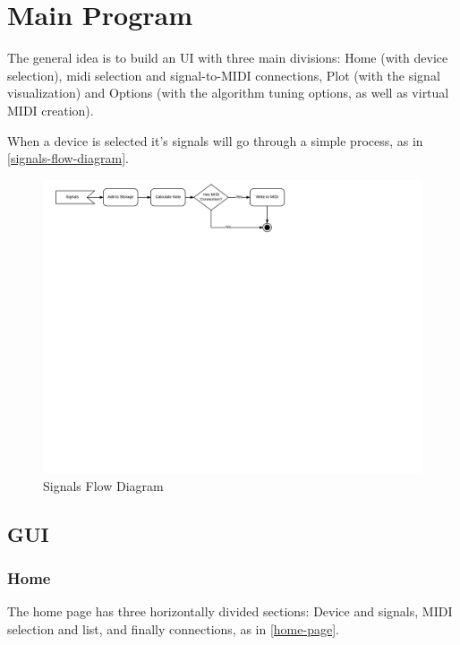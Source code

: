 \section{Main Program}
\label{main-program}

The general idea is to build an UI with three main divisions: Home (with device
selection), midi selection and signal-to-MIDI connections, Plot (with the signal
visualization) and Options (with the algorithm tuning options, as well as virtual
MIDI creation).

When a device is selected it's signals will go through a simple process, as in \autoref{signals-flow-diagram}.
\begin{figure}[htb]
	\caption{Signals Flow Diagram}
  \label{signals-flow-diagram}
	\begin{center}
    \includegraphics[scale=0.9]{images/signals-flow-diagram}
	\end{center}
\end{figure}

\subsection{GUI}

\subsubsection{Home}
The home page has three horizontally divided sections: Device and signals, MIDI selection
and list, and  finally connections, as in \autoref{home-page}. 


